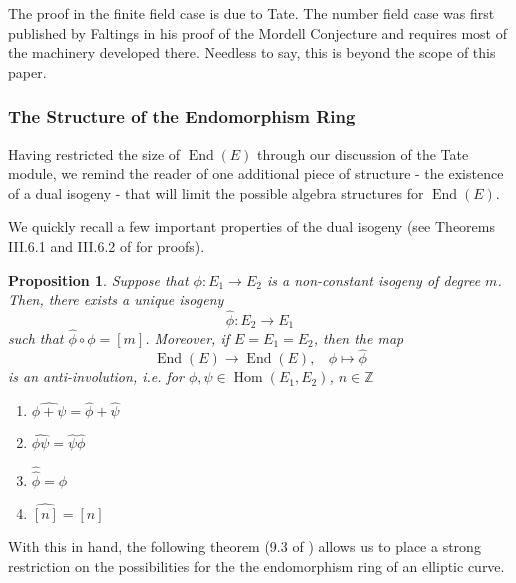 \documentclass{amsart}
\newtheorem{prop}[thm]{Proposition}
\theoremstyle{definition}
\theoremstyle{remark}
\numberwithin{equation}{section}
\newcommand{\bbZ}{\mathbb Z}
\DeclareMathOperator{\End}{End}
\DeclareMathOperator{\Hom}{Hom}
\begin{document}
The proof in the finite field case is due to Tate. The number field case was first published by Faltings in his proof of the Mordell Conjecture and requires most of the machinery developed there. Needless to say, this is beyond the scope of this paper.

 \subsubsection{The Structure of the Endomorphism Ring}

Having restricted the size of $\End(E)$ through our discussion of the Tate module, we remind the reader of one additional piece of structure - the existence of a dual isogeny - that will limit the possible algebra structures for $\End(E)$. 

We quickly recall a few important properties of the dual isogeny (see Theorems III.6.1 and III.6.2 of \cite{SilvermanAEC} for proofs).

\begin{prop}
Suppose that $\phi: E_{1} \to E_{2}$ is a non-constant isogeny of degree $m$. Then, there exists a unique isogeny 
\[
\widehat{\phi}: E_{2} \to E_{1}
\]
such that $\widehat{\phi} \circ \phi = [m]$. Moreover, if $E = E_{1} = E_{2}$, then the map 
\[
 \End(E) \to \End(E), \ \ \ \ \phi \mapsto \widehat{\phi}
\]
is an anti-involution, i.e. for $\phi, \psi \in \Hom(E_1, E_2)$, $n \in \bbZ$
\begin{enumerate}
\item $\widehat{\phi + \psi} = \widehat{\phi} + \widehat{\psi}$
\item $\widehat{\phi \psi}   =  \widehat{\psi} \widehat{\phi}$ 
\item $\hat{\hat{\phi}} = \phi$
\item $\widehat{[n]} = [n]$
\end{enumerate}
\end{prop}

With this in hand, the following theorem (9.3 of \cite{SilvermanAEC}) allows us to place a strong restriction on the possibilities for the the endomorphism ring of an elliptic curve.
\end{document}
